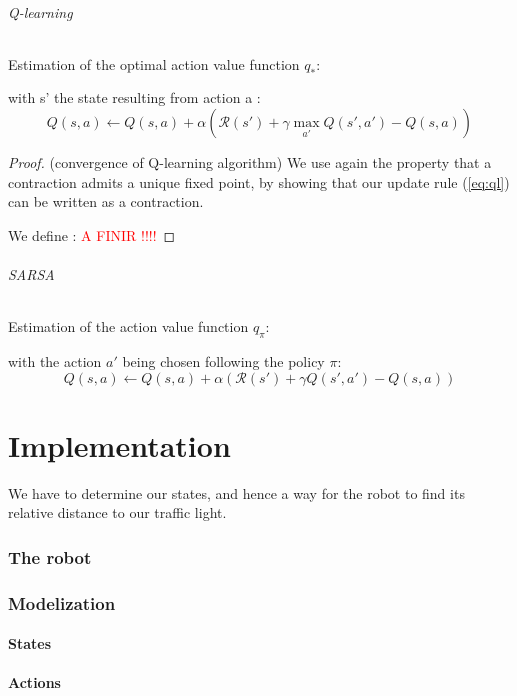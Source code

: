 \documentclass[14pt,a4paper]{article}
\theoremstyle{definition}
\begin{document}
\paragraph{Q-learning} Estimation of the optimal action value function $q_*$:


with s' the state resulting from action a :
\begin{equation}
Q(s,a) \leftarrow Q(s,a) + \alpha \left( \mathcal{R}(s') + \gamma \max_{a'}Q(s',a') - Q(s,a) \right) 
\label{eq:ql}
\end{equation}

\begin{proof} (convergence of Q-learning algorithm)
We use again the property that a contraction admits a unique fixed point, by showing that our update rule (\ref{eq:ql}) can be written as a contraction.

We define : \textcolor{red}{A FINIR !!!!}
\end{proof}


\paragraph{SARSA} Estimation of the action value function $q_{\pi}$:

with the action $a'$ being chosen following the policy $\pi$:
\begin{equation}
Q(s,a) \leftarrow Q(s,a) + \alpha \left( \mathcal{R}(s') + \gamma Q(s',a') - Q(s,a) \right)
\end{equation}
\newpage
\part*{Implementation}
We have to determine our states, and hence a way for the robot to find its relative distance to our traffic light.
\section{The robot}
\section{Modelization}
\subsection{States}
\subsection{Actions}
\end{document}
